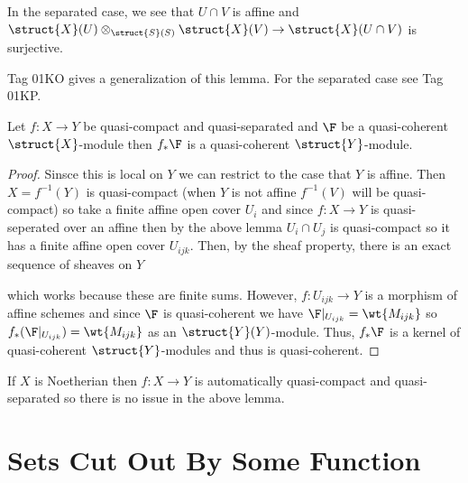 \documentclass[12pt]{article}
\begin{document}
\begin{rmk}
In the separated case, we see that $U \cap V$ is affine and $\struct{X}(U) \otimes_{\struct{S}(S)} \struct{X}(V) \to \struct{X}(U \cap V)$ is surjective.
\end{rmk}

\begin{rmk}
Tag 01KO gives a generalization of this lemma. For the separated case see Tag 01KP.
\end{rmk}

\begin{lemma}
Let $f : X \to Y$ be quasi-compact and quasi-separated and $\F$ be a quasi-coherent $\struct{X}$-module then $f_* \F$ is a quasi-coherent $\struct{Y}$-module.
\end{lemma}

\begin{proof}
Sinsce this is local on $Y$ we can restrict to the case that $Y$ is affine. Then   $X = f^{-1}(Y)$ is quasi-compact (when $Y$ is not affine $f^{-1}(V)$ will be quasi-compact) so take a finite affine open cover $U_i$ and since $f : X \to Y$ is quasi-seperated over an affine then by the above lemma $U_i \cap U_j$ is quasi-compact so it has a finite affine open cover $U_{ijk}$. Then, by the sheaf property, there is an exact sequence of sheaves on $Y$
\begin{center}
\end{center}
which works because these are finite sums. However, $f : U_{ijk} \to Y$ is a morphism of affine schemes and since $\F$ is quasi-coherent we have $\F |_{U_{ijk}} = \wt{M_{ijk}}$ so $f_* (\F|_{U_{ijk}}) = \wt{M_{ijk}}$ as an $\struct{Y}(Y)$-module. Thus, $f_* \F$ is a kernel of quasi-coherent $\struct{Y}$-modules and thus is quasi-coherent. 
\end{proof}

\begin{rmk}
If $X$ is Noetherian then $f : X \to Y$ is automatically quasi-compact and quasi-separated so there is no issue in the above lemma.
\end{rmk}


\section{Sets Cut Out By Some Function}
\end{document}
